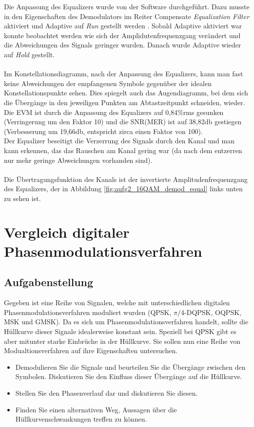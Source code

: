 \documentclass[12pt,a4paper,ngerman]{article}
\begin{document}
Die Anpassung des Equalizers wurde von der Software durchgeführt. Dazu musste in den Eigenschaften des Demodulators im Reiter Compensate \emph{Equalization Filter} aktiviert und Adaptive auf \emph{Run} gestellt werden \cite[23]{skript}.
Sobald Adaptive aktiviert war konnte beobachtet werden wie sich der Amplidutenfrequenzgang verändert und die Abweichungen des Signals geringer wurden. Danach wurde Adaptive wieder auf \emph{Hold} gestellt.\\
\\
Im Konstellationsdiagramm, nach der Anpassung des Equalizers, kann man fast keine Abweichungen der empfangenen Symbole gegenüber der idealen Konstellationspunkte sehen. Dies spiegelt auch das Augendiagramm, bei dem sich die Übergänge in den jeweiligen Punkten am Abtastzeitpunkt schneiden, wieder.\\
Die EVM ist durch die Anpassung des Equalizers auf 0,84\%rms gesunken (Verringerung um den Faktor 10) und die SNR(MER) ist auf 38,82db gestiegen (Verbesserung um 19,66db, entspricht zirca einen Faktor von 100).\\
Der Equalizer beseitigt die Verzerrung des Signals durch den Kanal und man kann erkennen, das das Rauschen am Kanal gering war (da nach dem entzerren nur mehr geringe Abweichungen vorhanden sind).\\
\\
Die Übertragungsfunktion des Kanals ist der invertierte Amplitudenfrequenzgang des Equalizers, der in Abbildung \ref{fig:aufg2_16QAM_demod_equal} links unten zu sehen ist.

\pagebreak



\section{Vergleich digitaler Phasenmodulationsverfahren}
\subsection{Aufgabenstellung}
Gegeben ist eine Reihe von Signalen, welche mit unterschiedlichen digitalen Phasenmodulationsverfahren moduliert wurden (QPSK, $\pi/4$-DQPSK, OQPSK, MSK und GMSK). Da es sich um Phasenmodulationsverfahren handelt, sollte die Hüllkurve dieser Signale idealerweise konstant sein. Speziell bei QPSK gibt es aber mitunter starke Einbrüche in der Hüllkurve. Sie sollen nun eine Reihe von Modualtionsverfahren auf ihre Eigenschaften untersuchen. 
\begin{itemize}
\item Demodulieren Sie die Signale und beurteilen Sie die Übergänge zwischen den Symbolen. Diskutieren Sie den Einfluss dieser Übergänge auf die Hüllkurve. 
\item Stellen Sie den Phasenverlauf dar und diskutieren Sie diesen.
\item Finden Sie einen alternativen Weg, Aussagen über die Hüllkurvenschwankungen treffen zu können.
\end{itemize}
\end{document}
